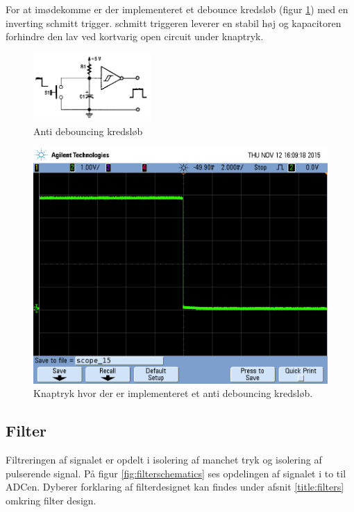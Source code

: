 For at imødekomme  er der implementeret et debounce kredsløb (figur \ref{fig:antidebouncingcircuit}) med en inverting schmitt trigger. schmitt triggeren leverer en stabil høj og kapacitoren forhindre den lav ved kortvarig open circuit under knaptryk. 
\begin{figure}[H]
	\centering
	\includegraphics[width = 0.4\textwidth]{billeder/debounceSchematic.png}
	\caption{Anti debouncing kredsløb}\label{fig:antidebouncingcircuit}
\end{figure}

\begin{figure}[H]
	\includegraphics[width = \textwidth]{billeder/scope_15.png}
	\caption{Knaptryk hvor der er implementeret et anti debouncing kredsløb.}\label{fig:withoutbounce}
\end{figure}


\subsection{Filter}
Filtreringen af signalet er opdelt i isolering af manchet tryk og isolering af pulserende signal. På figur \ref{fig:filterschematics} ses opdelingen af signalet i to til ADCen. Dyberer forklaring af filterdesignet kan findes under afsnit \ref{title:filters} omkring filter design.

